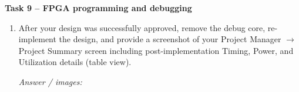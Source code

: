 \documentclass[11pt,a4paper]{article}
\newcommand{\answerspace}[1]{%
  \par\vspace{1mm}\noindent\textit{Answer / images:}\par\vspace{#1}%
}
\begin{document}
\vspace{0.8em}
\textbf{Task 9 -- FPGA programming and debugging}
\begin{enumerate}[label=(\alph*),leftmargin=2.2em,topsep=2pt,start=3]
  \item After your design was successfully approved, remove the debug core, re-implement the design, and provide a screenshot of your Project Manager $\rightarrow$ Project Summary screen including post-implementation Timing, Power, and Utilization details (table view).
  \answerspace{4cm}
\end{enumerate}
\end{document}
